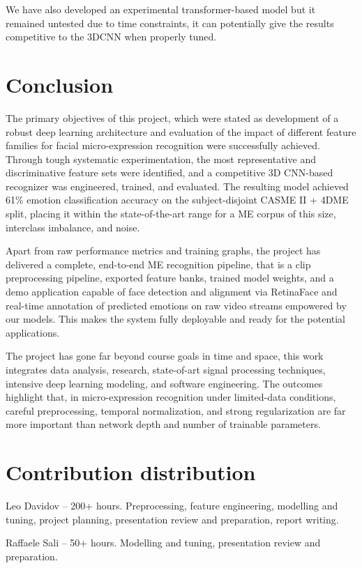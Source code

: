 \documentclass{article}
\begin{document}
We have also developed an experimental transformer-based model but it remained untested due to time constraints, it can potentially give the results competitive to the 3DCNN when properly tuned.

\section{Conclusion }
The primary objectives of this project, which were stated as development of a robust deep learning architecture and evaluation of the impact of different feature families for facial micro-expression recognition were successfully achieved. Through tough systematic experimentation, the most representative and discriminative feature sets were identified, and a competitive 3D CNN-based recognizer was engineered, trained, and evaluated. The resulting model achieved 61\% emotion classification accuracy on the subject-disjoint CASME II + 4DME split, placing it within the state-of-the-art range for a ME corpus of this size, interclass imbalance, and noise.

Apart from raw performance metrics and training graphs, the project has delivered a complete, end-to-end ME recognition pipeline, that is a clip preprocessing pipeline, exported feature banks, trained model weights, and a demo application capable of face detection and alignment via RetinaFace and real-time annotation of predicted emotions on raw video streams empowered by our models. This makes the system fully deployable and ready for the potential applications.

The project has gone far beyond course goals in time and space, this work integrates data analysis, research, state-of-art signal processing techniques, intensive deep learning modeling, and software engineering. The outcomes highlight that, in micro-expression recognition under limited-data conditions, careful preprocessing, temporal normalization, and strong regularization are far more important than network depth and number of trainable parameters.

\section{Contribution distribution }
Leo Davidov – 200+ hours. Preprocessing, feature engineering, modelling and tuning, project planning, presentation review and preparation, report writing.

Raffaele Sali – 50+ hours. Modelling and tuning, presentation review and preparation.
\end{document}
